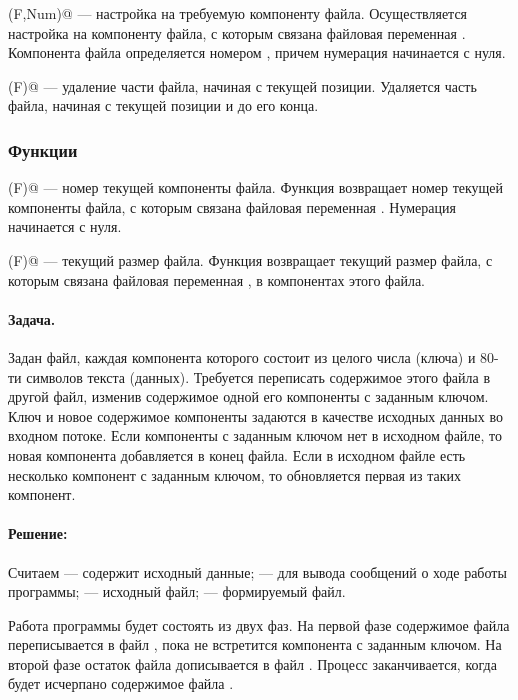 \documentclass[12pt,a4paper]{article}
\theoremstyle{plain}
\theoremstyle{definition}
\theoremstyle{remark}
\begin{document}
\verb@Seek(F,Num)@ --- настройка на требуемую компоненту файла. Осуществляется настройка на компоненту файла, с которым связана файловая переменная \verb@F@. Компонента файла определяется номером \verb@Num@, причем нумерация начинается с нуля.

\verb@Truncate(F)@ --- удаление части файла, начиная с текущей позиции.  Удаляется часть файла, начиная с текущей позиции и до его конца.

\subsubsection*{Функции}

\verb@FilePos(F)@ --- номер текущей компоненты файла. Функция возвращает номер текущей компоненты файла, с которым связана файловая переменная \verb@F@. Нумерация начинается с нуля. 

\verb@FileSize(F)@ --- текущий размер файла. Функция возвращает текущий размер файла, с которым связана файловая переменная \verb@F@, в компонентах этого файла.

\paragraph*{Задача.} Задан файл, каждая компонента которого состоит из целого числа (ключа) и 80-ти символов текста (данных). Требуется переписать содержимое этого файла в другой файл, изменив содержимое одной его компоненты с заданным ключом. Ключ и новое содержимое компоненты задаются в качестве исходных данных во входном потоке. Если компоненты с заданным ключом нет в исходном файле, то новая компонента добавляется в конец файла. Если в исходном файле есть несколько компонент с заданным ключом, то обновляется первая из таких компонент.

\paragraph*{Решение:}

Считаем \verb@input@ --- содержит исходный данные; \verb@output@ --- для вывода сообщений о ходе работы программы;  --- исходный файл; \verb@b@ --- формируемый файл.

Работа программы будет состоять из двух фаз. На первой фазе содержимое файла  переписывается в файл \verb@b@, пока не встретится компонента с заданным ключом. На второй фазе остаток файла  дописывается в файл \verb@b@. Процесс заканчивается, когда будет исчерпано содержимое файла .
\end{document}
